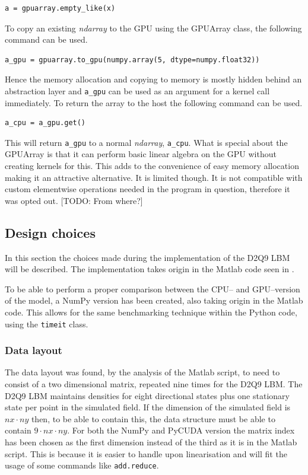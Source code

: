 \begin{verbatim}
a = gpuarray.empty_like(x)
\end{verbatim}

To copy an existing \textit{ndarray} to the GPU using the GPUArray class, the following command can be used.

\begin{verbatim}
a_gpu = gpuarray.to_gpu(numpy.array(5, dtype=numpy.float32))
\end{verbatim}

Hence the memory allocation and copying to memory is mostly hidden behind an abstraction layer and \texttt{a\_gpu} can be used as an argument for a kernel call immediately. To return the array to the host the following command can be used.

\begin{verbatim}
a_cpu = a_gpu.get()
\end{verbatim}

This will return \texttt{a\_gpu} to a normal \textit{ndarray}, \texttt{a\_cpu}. What is special about the GPUArray is that it can perform basic linear algebra on the GPU without creating kernels for this. This adds to the convenience of easy memory allocation making it an attractive alternative. It is limited though. It is not compatible with custom elementwise operations needed in the program in question, therefore it was opted out. [TODO: From where?]



\subsection{Design choices}
In this section the choices made during the implementation of the D2Q9 LBM will be described. The implementation takes origin in the Matlab code seen in .

To be able to perform a proper comparison between the CPU-- and GPU--version of the model, a NumPy version has been created, also taking origin in the Matlab code. This allows for the same benchmarking technique within the Python code, using the \texttt{timeit} class.



\subsubsection{Data layout}
The data layout was found, by the analysis of the Matlab script, to need to consist of a two dimensional matrix, repeated nine times for the D2Q9 LBM. The D2Q9 LBM maintains densities for eight directional states plus one stationary state per point in the simulated field. If the dimension of the simulated field is $nx \cdot ny$ then, to be able to contain this, the data structure must be able to contain $9 \cdot nx \cdot ny$. For both the NumPy and PyCUDA version the matrix index has been chosen as the first dimension instead of the third as it is in the Matlab script. This is because it is easier to handle upon linearisation and will fit the usage of some commands like \texttt{add.reduce}.



